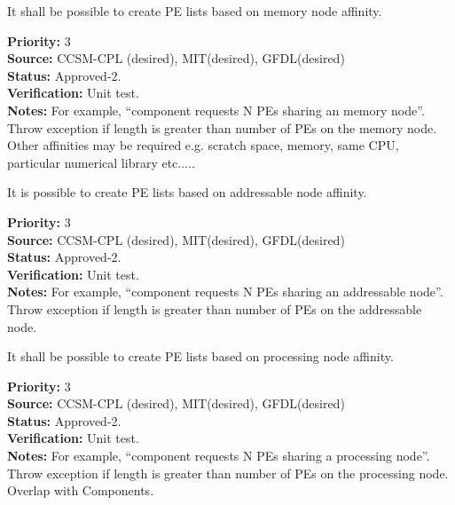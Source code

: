 
It shall be possible to create PE lists based on memory node affinity.

\begin{reqlist}
{\bf Priority:} 3 \\
{\bf Source:}  CCSM-CPL (desired), MIT(desired), GFDL(desired) \\
{\bf Status:} Approved-2. \\
{\bf Verification:} Unit test. \\ 
{\bf Notes:}  For example, ``component requests N PEs sharing an memory 
node''. Throw exception if length is greater than number of PEs on the memory node. 
Other affinities may be required e.g. scratch space, memory, same CPU,
particular numerical library etc.....
\end{reqlist}


It is possible to create PE lists based on addressable node affinity.

\begin{reqlist}
{\bf Priority:} 3 \\
{\bf Source:}  CCSM-CPL (desired), MIT(desired), GFDL(desired) \\
{\bf Status:} Approved-2. \\
{\bf Verification:} Unit test. \\ 
{\bf Notes:}  For example, ``component requests N PEs sharing an 
addressable node''. Throw exception if length is greater than number
of PEs on the addressable node.
\end{reqlist}


It shall be possible to create PE lists based on processing node affinity.

\begin{reqlist}
{\bf Priority:} 3 \\
{\bf Source:}  CCSM-CPL (desired), MIT(desired), GFDL(desired) \\
{\bf Status:} Approved-2. \\
{\bf Verification:} Unit test. \\ 
{\bf Notes:}  For example, ``component requests N PEs sharing a processing
node''.  Throw exception if length is greater than number of PEs on 
the processing node.  Overlap with Components.
\end{reqlist}

